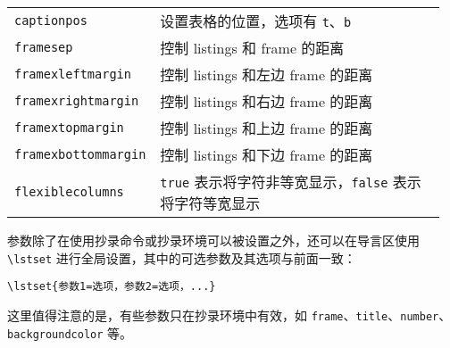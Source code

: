 \documentclass[UTF8,hyperref]{ctexart}
\begin{document}
\begin{longtable}{@{}p{0.23\linewidth}p{0.73\linewidth}}
	\verb|captionpos| & 设置表格的位置，选项有 \verb|t|、\verb|b| \\
	\verb|framesep| & 控制 listings 和 frame 的距离 \\
	\verb|framexleftmargin| & 控制 listings 和左边 frame 的距离 \\
	\verb|framexrightmargin| & 控制 listings 和右边 frame 的距离 \\
	\verb|framextopmargin| & 控制 listings 和上边 frame 的距离 \\
	\verb|framexbottommargin| & 控制 listings 和下边 frame 的距离 \\
	\verb|flexiblecolumns| & \verb|true| 表示将字符非等宽显示，\verb|false| 表示将字符等宽显示 \\
\end{longtable}

参数除了在使用抄录命令或抄录环境可以被设置之外，还可以在导言区使用 \verb|\lstset| 进行全局设置，其中的可选参数及其选项与前面一致：
\begin{flushleft}
\verb|\lstset{参数1=选项，参数2=选项，...}|
\end{flushleft}
这里值得注意的是，有些参数只在抄录环境中有效，如 \verb|frame|、\verb|title|、\verb|number|、\verb|backgroundcolor| 等。
\end{document}
